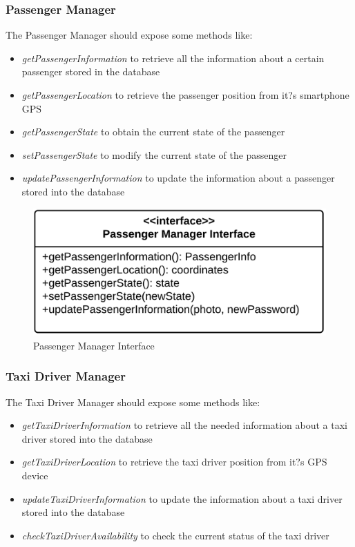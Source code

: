 \subsubsection{Passenger Manager}
The Passenger Manager should expose some methods like:
\begin{itemize}
	\item \textit{getPassengerInformation} to retrieve all the information about a certain passenger stored in the database
	\item \textit{getPassengerLocation} to retrieve the passenger position from it?s smartphone GPS
	\item \textit{getPassengerState} to obtain the current state of the passenger
	\item \textit{setPassengerState} to modify the current state of the passenger
	\item \textit{updatePassengerInformation} to update the information about a passenger stored into the database
\end{itemize}

\begin{figure}[htbp]
\centering
\includegraphics[width=\textwidth]{cpt/img/ComponentInterfacesPassengerManagerInterface}
\caption{Passenger Manager Interface}
\end{figure}
\clearpage

\subsubsection{Taxi Driver Manager}
The Taxi Driver Manager should expose some methods like:
\begin{itemize}
	\item \textit{getTaxiDriverInformation} to retrieve all the needed information about a taxi driver stored into the database
	\item \textit{getTaxiDriverLocation} to retrieve the taxi driver position from it?s GPS device
	\item \textit{updateTaxiDriverInformation} to update the information about a taxi driver stored into the database
	\item \textit{checkTaxiDriverAvailability} to check the current status of the taxi driver
\end{itemize}

